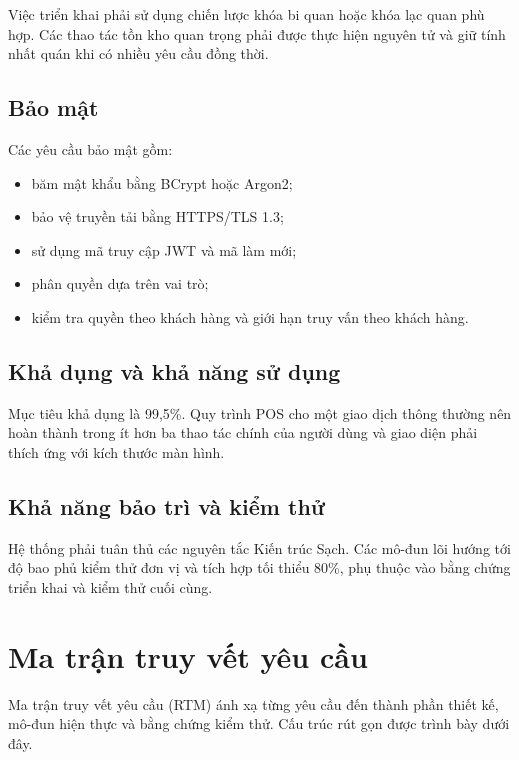 Việc triển khai phải sử dụng chiến lược khóa bi quan hoặc khóa lạc quan phù hợp. Các thao tác
tồn kho quan trọng phải được thực hiện nguyên tử và giữ tính nhất quán khi có nhiều yêu cầu
đồng thời.

\subsection{Bảo mật}

Các yêu cầu bảo mật gồm:

\begin{itemize}
    \item băm mật khẩu bằng BCrypt hoặc Argon2;
    \item bảo vệ truyền tải bằng HTTPS/TLS 1.3;
    \item sử dụng mã truy cập JWT và mã làm mới;
    \item phân quyền dựa trên vai trò;
    \item kiểm tra quyền theo khách hàng và giới hạn truy vấn theo khách hàng.
\end{itemize}

\subsection{Khả dụng và khả năng sử dụng}

Mục tiêu khả dụng là 99,5\%. Quy trình POS cho một giao dịch thông thường nên hoàn thành trong
ít hơn ba thao tác chính của người dùng và giao diện phải thích ứng với kích thước màn hình.

\subsection{Khả năng bảo trì và kiểm thử}

Hệ thống phải tuân thủ các nguyên tắc Kiến trúc Sạch. Các mô-đun lõi hướng tới độ bao phủ kiểm
thử đơn vị và tích hợp tối thiểu 80\%, phụ thuộc vào bằng chứng triển khai và kiểm thử cuối cùng.

\section{Ma trận truy vết yêu cầu}

Ma trận truy vết yêu cầu (RTM) ánh xạ từng yêu cầu đến thành phần thiết kế, mô-đun hiện thực
và bằng chứng kiểm thử. Cấu trúc rút gọn được trình bày dưới đây.

